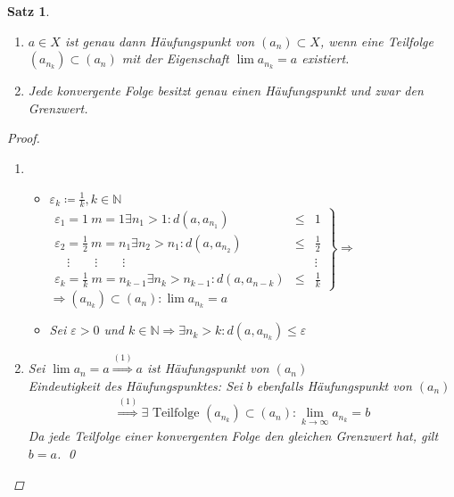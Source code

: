 \documentclass[ngerman,titlepage,twoside, parskip=half*]{scrreprt}
\newcommand*{\N}{\mathbb{N}}
\theoremstyle{break}
\newtheorem{theorem}{Satz}[section]
\theoremstyle{nonumberbreak}
\newtheorem{proof}{Beweis:}
\begin{document}
\begin{theorem}
\label{satz:hp}
\begin{enumerate}
\item $a\in X$ ist genau dann Häufungspunkt von $(a_n) \subset X$,
  wenn eine Teilfolge $(a_{n_k})\subset (a_n)$ mit der Eigenschaft
  $\lim a_{n_k}=a$ existiert.
\item Jede konvergente Folge besitzt genau einen Häufungspunkt und
  zwar den Grenzwert.
\end{enumerate}
  \begin{proof}
\begin{enumerate}
  \item
    \begin{itemize}
      \item[$\Rightarrow$] $\varepsilon_k\coloneqq\frac{1}{k}, k \in \N$\\
        $\left.
	\begin{array}{lll}
	  \varepsilon_1=1\ m=1 \exists n_1>1\colon d(a,a_{n_1}) & \leq & 1\\
	  \varepsilon_2=\frac{1}{2}\ m = n_1 \exists n_2 >n_1\colon
	  d(a,a_{n_2}) & \leq & \frac{1}{2}\\
	  \quad \vdots \qquad \vdots \qquad \vdots & & \vdots\\
	  \varepsilon_k=\frac{1}{k}\ m=n_{k-1} \exists n_k > n_{k-1}\colon
	  d(a,a_{n-k}) & \leq & \frac{1}{k}
	\end{array}
	\right\} \Rightarrow$\\
	$\Rightarrow (a_{n_k})\subset (a_n)\colon\lim a_{n_k}=a$
      \item[$\Leftarrow$] Sei $\varepsilon > 0$ und $k \in \N \Rightarrow \exists n_k>k\colon d(a,a_{n_k})\leq \varepsilon$
    \end{itemize}
  \item Sei $\lim a_n =a \overset{(1)}{\Rightarrow} a$ ist Häufungspunkt von $(a_n)$\\
    Eindeutigkeit des Häufungspunktes: Sei $b$ ebenfalls Häufungspunkt von $(a_n)$
    \begin{gather*}\overset{(1)}{\Rightarrow} \exists \text{ Teilfolge } (a_{n_k})\subset (a_n)\colon\lim_{k\rightarrow \infty}a_{n_k}=b\end{gather*}
    Da jede Teilfolge einer konvergenten Folge den gleichen Grenzwert hat, gilt $b=a$. \qed
\end{enumerate}    
  \end{proof}
\end{theorem}
\end{document}
